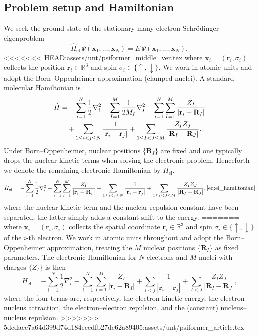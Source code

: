 \subsection{Problem setup and Hamiltonian}
We seek the ground state of the stationary many-electron Schr\"odinger eigenproblem
\begin{equation}
	\hat{H}_{\mathrm{el}}\,\Psi(\mathbf{x}_{1},\dots,\mathbf{x}_{N})=E\,\Psi(\mathbf{x}_{1},\dots,\mathbf{x}_{N}),
\end{equation}
<<<<<<< HEAD:assets/unt/psiformer_middle_ver.tex
where $\mathbf{x}_i=(\mathbf{r}_i,\sigma_i)$ collects the position $\mathbf{r}_i\in\mathbb{R}^3$ and spin $\sigma_i\in\{\uparrow,\downarrow\}$. We work in atomic units and adopt the Born--Oppenheimer approximation (clamped nuclei). A standard molecular Hamiltonian is
\begin{align}
	\hat H & =
	-\sum_{i=1}^{N}\frac{1}{2}\nabla_i^{2}
	-\sum_{I=1}^{M}\frac{1}{2M_I}\nabla_{I}^{2}
	-\sum_{i=1}^{N}\sum_{I=1}^{M}\frac{Z_I}{|\mathbf r_i-\mathbf R_I|} \notag\\
	&\quad +\sum_{1\le i<j\le N}\frac{1}{|\mathbf r_i-\mathbf r_j|}
	+\sum_{1\le I<J\le M}\frac{Z_I Z_J}{|\mathbf R_I-\mathbf R_J|}.
\end{align}
Under Born--Oppenheimer, nuclear positions $\{\mathbf{R}_I\}$ are fixed and one typically drops the nuclear kinetic terms when solving the electronic problem.  Henceforth we denote the remaining electronic Hamiltonian by $\hat{H}_{\text{el}}$.
\begin{equation}
	\hat{H}_{\text{el}} =
	-\sum_{i=1}^{N}\frac{1}{2}\nabla_i^{2}
	-\sum_{i=1}^{N}\sum_{I=1}^{M}\frac{Z_I}{|\mathbf r_i-\mathbf R_I|}
	+\sum_{1\le i<j\le N}\frac{1}{|\mathbf r_i-\mathbf r_j|}
	+\sum_{1\le I<J\le M}\frac{Z_I Z_J}{|\mathbf R_I-\mathbf R_J|},
	\ref{eq:el_hamiltonian}
\end{equation}
where the nuclear kinetic term and the nuclear repulsion constant have been separated; the latter simply adds a constant shift to the energy.
=======
where $\mathbf{x}_i=(\mathbf{r}_i,\sigma_i)$ collects the spatial coordinate $\mathbf{r}_i\in\mathbb{R}^3$ and spin $\sigma_i\in\{\uparrow,\downarrow\}$ of the $i$-th electron. We work in atomic units throughout and adopt the Born--Oppenheimer approximation, treating the $M$ nuclear positions $\{\mathbf{R}_I\}$ as fixed parameters. The electronic Hamiltonian for $N$ electrons and $M$ nuclei with charges $\{Z_I\}$ is then
\begin{equation}
	\hat{H}_{\mathrm{el}}
	= -\sum_{i=1}^{N}\frac{1}{2}\nabla_i^{2}
	  -\sum_{i=1}^{N}\sum_{I=1}^{M}\frac{Z_I}{|\mathbf{r}_i-\mathbf{R}_I|}
	  +\sum_{i<j}\frac{1}{|\mathbf{r}_i-\mathbf{r}_j|}
	  +\sum_{I<J}\frac{Z_I Z_J}{|\mathbf{R}_I-\mathbf{R}_J|},
\end{equation}
where the four terms are, respectively, the electron kinetic energy, the electron--nucleus attraction, the electron--electron repulsion, and the (constant) nucleus--nucleus repulsion.
>>>>>>> 5dcdace7a64d399d74d184ecedfb27de62a89405:assets/unt/psiformer_article.tex

